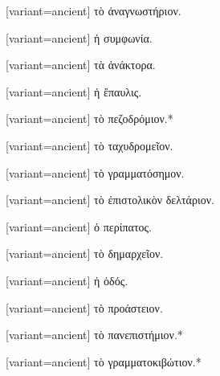 \switchcolumn*
{}%
\switchcolumn
\begin{greek}[variant=ancient]%
τὸ ἀναγνωστήριον.%
\end{greek}%
\switchcolumn*
{}%
\switchcolumn
\begin{greek}[variant=ancient]%
ἡ συμφωνία.%
\end{greek}%
\switchcolumn*
{}%
\switchcolumn
\begin{greek}[variant=ancient]%
τὰ ἀνάκτορα.%
\end{greek}%
\switchcolumn*
{}%
\switchcolumn
\begin{greek}[variant=ancient]%
ἡ ἔπαυλις.%
\end{greek}%
\switchcolumn*
{}%
\switchcolumn
\begin{greek}[variant=ancient]%
τὸ πεζοδρόμιον.{*}%
\end{greek}%
\switchcolumn*
{}%
\switchcolumn
\begin{greek}[variant=ancient]%
τὸ ταχυδρομεῖον.%
\end{greek}%
\switchcolumn*
{}%
\switchcolumn
\begin{greek}[variant=ancient]%
τὸ γραμματόσημον.%
\end{greek}%
\switchcolumn*
{}%
\switchcolumn
\begin{greek}[variant=ancient]%
τὸ ἐπιστολικὸν δελτάριον.%
\end{greek}%
\switchcolumn*
{}%
\switchcolumn
\begin{greek}[variant=ancient]%
ὁ περίπατος.%
\end{greek}%
\switchcolumn*
{}%
\switchcolumn
\begin{greek}[variant=ancient]%
τὸ δημαρχεῖον.%
\end{greek}%
\switchcolumn*
{}%
\switchcolumn
\begin{greek}[variant=ancient]%
ἡ ὁδός.%
\end{greek}%
\switchcolumn*
{}%
\switchcolumn
\begin{greek}[variant=ancient]%
τὸ προάστειον.%
\end{greek}%
\switchcolumn*
{}%
\switchcolumn
\begin{greek}[variant=ancient]%
τὸ πανεπιστήμιον.{*}%
\end{greek}%
\switchcolumn*
{}%
\switchcolumn
\begin{greek}[variant=ancient]%
τὸ γραμματοκιβώτιον.{*}%
\end{greek}%
